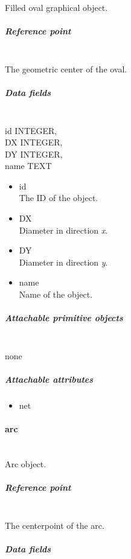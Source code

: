 \documentclass[12pt]{article}
\begin{document}
Filled oval graphical object.

\subparagraph{Reference point}\label{reference-point}

\mbox{}\\

The geometric center of the oval.

\subparagraph{Data fields}\label{data-fields}

\mbox{}\\

id INTEGER,\\
DX INTEGER,\\
DY INTEGER,\\
name TEXT

\begin{itemize}
\item
  id\\The ID of the object.
\item
  DX\\Diameter in direction \emph{x}.
\item
  DY\\Diameter in direction \emph{y}.
\item
  name\\Name of the object.
\end{itemize}

\subparagraph{Attachable primitive
objects}\label{attachable-primitive-objects}

\mbox{}\\

none

\subparagraph{Attachable attributes}\label{attachable-attributes}

\begin{itemize}
\item
  net
\end{itemize}

\paragraph{arc}\label{arc}

\mbox{}\\

Arc object.

\subparagraph{Reference point}\label{reference-point-1}

\mbox{}\\

The centerpoint of the arc.

\subparagraph{Data fields}\label{data-fields-1}
\end{document}
